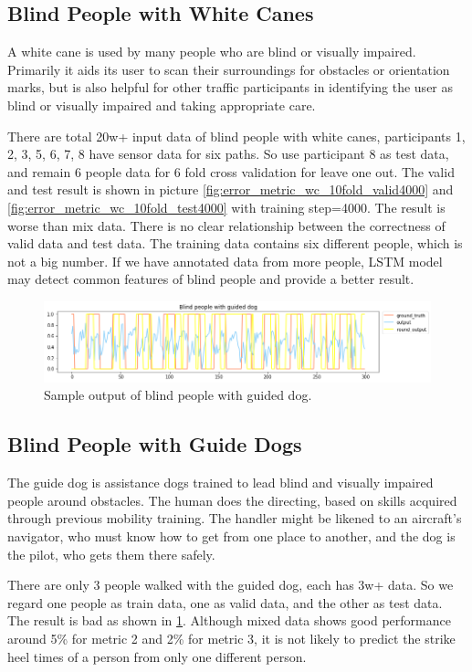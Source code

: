 \documentclass[11pt]{article}
\begin{document}
\subsection{Blind People with White Canes}
A white cane is used by many people who are blind or visually impaired. Primarily it aids its user to scan their surroundings for obstacles or orientation marks, but is also helpful for other traffic participants in identifying the user as blind or visually impaired and taking appropriate care.

There are total 20w+ input data of blind people with white canes, participants 1, 2, 3, 5, 6, 7, 8 have sensor data for six paths. So use participant 8 as test data, and remain 6 people data for 6 fold cross validation for leave one out. The valid and test result is shown in picture \ref{fig:error_metric_wc_10fold_valid4000} and \ref{fig:error_metric_wc_10fold_test4000} with training step=4000. The result is worse than mix data. There is no clear relationship between the correctness of valid data and test data. The training data contains six different people, which is not a big number. If we have annotated data from more people, LSTM model may detect common features of blind people and provide a better result.

\begin{figure}[ht]
\centering
\includegraphics[scale=0.5]{blind_gd}
\caption{Sample output of blind people with guided dog.}
\label{fig:blind_gd}
\end{figure}


\subsection{Blind People with Guide Dogs}

The guide dog is assistance dogs trained to lead blind and visually impaired people around obstacles. The human does the directing, based on skills acquired through previous mobility training. The handler might be likened to an aircraft's navigator, who must know how to get from one place to another, and the dog is the pilot, who gets them there safely.

There are only 3 people walked with the guided dog, each has 3w+ data. So we regard one people as train data, one as valid data, and the other as test data. The result is bad as shown in \ref{fig:blind_gd}. Although mixed data shows good performance around 5\% for metric 2 and 2\% for metric 3, it is not likely to predict the strike heel times of a person from only one different person.
\end{document}
